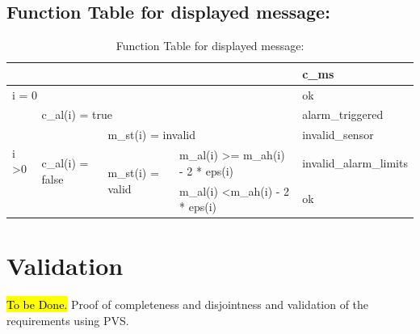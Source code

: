 \documentclass[fontsize=12pt,paper=letter,twoside]{scrartcl}
\begin{document}

\subsection{Function Table for displayed message: }
\begin{table}[]
\centering
\label{my-label}
\begin{tabular}{llll|l|}
\cline{5-5}
                                                        &                                                        &                                                        &                                              & c\_ms                  \\ \hline
\multicolumn{4}{|l|}{i = 0}                                                                                                                                                                                              & ok                     \\ \hline
\multicolumn{1}{|l|}{\multirow{4}{*}{i \textgreater 0}} & \multicolumn{3}{l|}{c\_al(i) = true}                                                                                                                           & alarm\_triggered       \\ \cline{2-5} 
\multicolumn{1}{|l|}{}                                  & \multicolumn{1}{l|}{\multirow{3}{*}{c\_al(i) = false}} & \multicolumn{2}{l|}{m\_st(i) = invalid}                                                               & invalid\_sensor        \\ \cline{3-5} 
\multicolumn{1}{|l|}{}                                  & \multicolumn{1}{l|}{}                                  & \multicolumn{1}{l|}{\multirow{2}{*}{m\_st(i) = valid}} & m\_al(i) \textgreater= m\_ah(i) - 2 * eps(i) & invalid\_alarm\_limits \\ \cline{4-5} 
\multicolumn{1}{|l|}{}                                  & \multicolumn{1}{l|}{}                                  & \multicolumn{1}{l|}{}                                  & m\_al(i) \textless m\_ah(i) - 2 * eps(i)     & ok                     \\ \hline
\end{tabular}
\caption{Function Table for displayed message: }
\end{table}

\section{Validation}
\hl{To be Done.}
Proof of completeness and disjointness and validation of the requirements using PVS.
\end{document}
